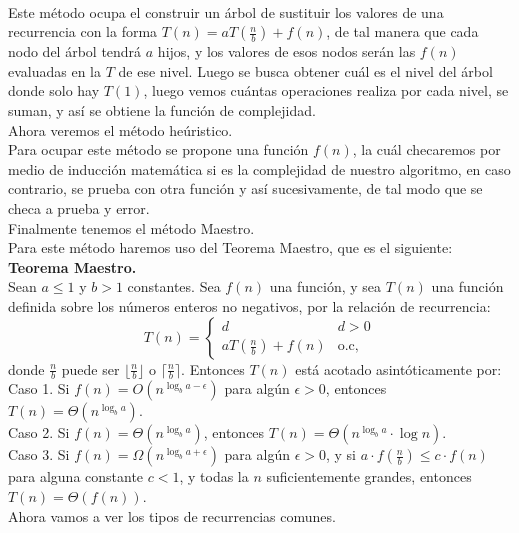 \documentclass[12pt,twoside]{article}
\begin{document}
\\ Este método ocupa el construir un árbol de sustituir los valores de una recurrencia con la forma $T(n)=aT(\frac{n}{b})+f(n)$, de tal manera que cada nodo del árbol tendrá $a$ hijos, y los valores de esos nodos serán las $f(n)$ evaluadas en la $T$ de ese nivel. Luego se busca obtener cuál es el nivel del árbol donde solo hay $T(1)$, luego vemos cuántas operaciones realiza por cada nivel, se suman, y así se obtiene la función de complejidad.
\newline
\\ Ahora veremos el método heúristico.
\\ Para ocupar este método se propone una función $f(n)$, la cuál checaremos por medio de inducción matemática si es la complejidad de nuestro algoritmo, en caso contrario, se prueba con otra función y así sucesivamente, de tal modo que se checa a prueba y error.
\newline
\\ Finalmente tenemos el método Maestro.
\\ Para este método haremos uso del Teorema Maestro, que es el siguiente:
\\ \textbf{Teorema Maestro.}
\\ Sean $a \leq 1$ y $b>1$ constantes. Sea $f(n)$ una función, y sea $T(n)$ una función definida sobre los números enteros no negativos, por la relación de recurrencia:
\begin{equation}
    T(n)=
    \begin{cases}
        d &\text{$d>0$} \\
        aT(\frac{n}{b})+f(n) &\text{o.c,}
    \end{cases}
\end{equation}
donde $\frac{n}{b}$ puede ser $\lfloor \frac{n}{b} \rfloor$ o $\lceil \frac{n}{b} \rceil$. Entonces $T(n)$ está acotado asintóticamente por:
\\ Caso 1. Si $f(n)= O(n^{\log_ba-\epsilon})$ para algún $\epsilon>0$, entonces $T(n)=\Theta(n^{\log_ba})$.
\\ Caso 2. Si $f(n)= \Theta(n^{\log_ba})$, entonces $T(n)=\Theta(n^{\log_ba}\cdot \log n)$.
\\ Caso 3. Si $f(n)= \Omega(n^{\log_ba+\epsilon})$ para algún $\epsilon>0$, y si $a\cdot f(\frac{n}{b})\leq c\cdot f(n)$ para alguna constante $c<1$, y todas la $n$ suficientemente grandes, entonces $T(n)=\Theta(f(n))$.
\newline
\\ Ahora vamos a ver los tipos de recurrencias comunes.
\end{document}
